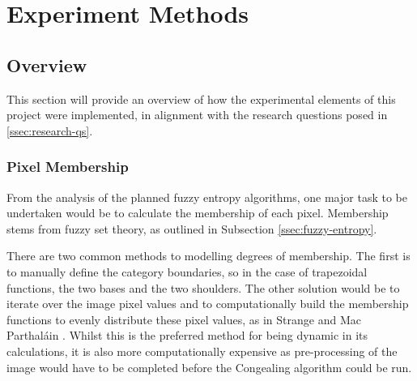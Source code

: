 \chapter{Experiment Methods}





\section{Overview}

This section will provide an overview of how the experimental elements of this project were implemented, in alignment with the research questions posed in \ref{ssec:research-qs}.

\subsection{Pixel Membership}
\label{sssec:member}

From the analysis of the planned fuzzy entropy algorithms, one major task to be undertaken would be to calculate the membership of each pixel. Membership stems from fuzzy set theory, as outlined in Subsection \ref{ssec:fuzzy-entropy}.

There are two common methods to modelling degrees of membership. The first is to manually define the category boundaries, so in the case of trapezoidal functions, the two bases and the two shoulders. The other solution would be to iterate over the image pixel values and to computationally build the membership functions to evenly distribute these pixel values, as in Strange and Mac Parthal\'ain \cite{Mac_Parthalain_Strange_2013}. Whilst this is the preferred method for being dynamic in its calculations, it is also more computationally expensive as pre-processing of the image would have to be completed before the \Gls{Congealing} algorithm could be run.

